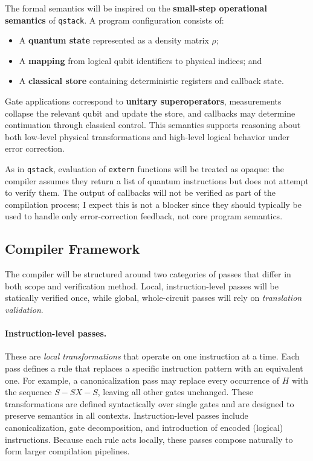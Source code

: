 The formal semantics will be inspired on the \textbf{small-step operational semantics} of \texttt{qstack}.  
A program configuration consists of:
\begin{itemize}
    \item A \textbf{quantum state} represented as a density matrix $\rho$;
    \item A \textbf{mapping} from logical qubit identifiers to physical indices; and
    \item A \textbf{classical store} containing deterministic registers and callback state.
\end{itemize}

Gate applications correspond to \textbf{unitary superoperators}, measurements collapse the relevant qubit and update the store, and callbacks may determine continuation through classical control.  
This semantics supports reasoning about both low-level physical transformations and high-level logical behavior under error correction.

As in \texttt{qstack}, evaluation of \texttt{extern} functions will be treated as opaque: the compiler assumes they return a list of quantum instructions but does not attempt to verify them.  
The output of callbacks will not be verified as part of the compilation process; I expect this is not a blocker since they should typically be used to handle only error-correction feedback, not core program semantics.

\subsection{Compiler Framework}

The compiler will be structured around two categories of passes that differ in both scope and verification method. Local, instruction-level passes will be statically verified once, while global, whole-circuit passes will rely on \emph{translation validation}.

\paragraph{Instruction-level passes.}
These are \emph{local transformations} that operate on one instruction at a time.  
Each pass defines a rule that replaces a specific instruction pattern with an equivalent one.  
For example, a canonicalization pass may replace every occurrence of \(H\) with the sequence \(S\!-\!SX\!-\!S\), leaving all other gates unchanged.  
These transformations are defined syntactically over single gates and are designed to preserve semantics in all contexts.  
Instruction-level passes include canonicalization, gate decomposition, and introduction of encoded (logical) instructions.  
Because each rule acts locally, these passes compose naturally to form larger compilation pipelines.

